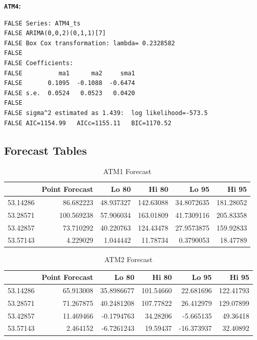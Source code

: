 \documentclass[openany]{book}
\begin{document}
\textbf{\texttt{ATM4}:}

\begin{verbatim}
FALSE Series: ATM4_ts 
FALSE ARIMA(0,0,2)(0,1,1)[7] 
FALSE Box Cox transformation: lambda= 0.2328582 
FALSE 
FALSE Coefficients:
FALSE          ma1      ma2     sma1
FALSE       0.1095  -0.1088  -0.6474
FALSE s.e.  0.0524   0.0523   0.0420
FALSE 
FALSE sigma^2 estimated as 1.439:  log likelihood=-573.5
FALSE AIC=1154.99   AICc=1155.11   BIC=1170.52
\end{verbatim}

\hypertarget{Part-A-FC}{%
\subsection*{Forecast Tables}\label{Part-A-FC}}

\begin{table}[H]

\caption{\label{tab:unnamed-chunk-11}ATM1 Forecast}
\centering
\begin{tabular}{l|r|r|r|r|r}
\hline
\textbf{ } & \textbf{Point Forecast} & \textbf{Lo 80} & \textbf{Hi 80} & \textbf{Lo 95} & \textbf{Hi 95}\\
\hline
\rowcolor{gray!6}  53.14286 & 86.682223 & 48.937327 & 142.63088 & 34.8072635 & 181.28052\\
\hline
53.28571 & 100.569238 & 57.906034 & 163.01809 & 41.7309116 & 205.83358\\
\hline
\rowcolor{gray!6}  53.42857 & 73.710292 & 40.220763 & 124.43478 & 27.9573875 & 159.92833\\
\hline
53.57143 & 4.229029 & 1.044442 & 11.78734 & 0.3790053 & 18.47789\\
\hline
\end{tabular}
\end{table}

\begin{table}[H]

\caption{\label{tab:unnamed-chunk-11}ATM2 Forecast}
\centering
\begin{tabular}{l|r|r|r|r|r}
\hline
\textbf{ } & \textbf{Point Forecast} & \textbf{Lo 80} & \textbf{Hi 80} & \textbf{Lo 95} & \textbf{Hi 95}\\
\hline
\rowcolor{gray!6}  53.14286 & 65.913008 & 35.8986677 & 101.54660 & 22.681696 & 122.41793\\
\hline
53.28571 & 71.267875 & 40.2481208 & 107.77822 & 26.412979 & 129.07899\\
\hline
\rowcolor{gray!6}  53.42857 & 11.469466 & -0.1794763 & 34.28206 & -5.665135 & 49.36418\\
\hline
53.57143 & 2.464152 & -6.7261243 & 19.59437 & -16.373937 & 32.40892\\
\hline
\end{tabular}
\end{table}
\end{document}
